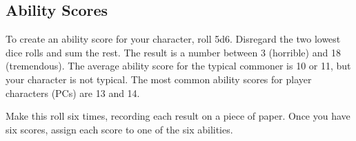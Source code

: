 \subsection{Ability Scores}

To create an ability score for your character, roll 5d6. Disregard the two lowest dice rolls and sum the rest. The result is a number between 3 (horrible) and 18 (tremendous). The average ability score for the typical commoner is 10 or 11, but your character is not typical. The most common ability scores for player characters (PCs) are 13 and 14.

Make this roll six times, recording each result on a piece of paper. Once you have six scores, assign each score to one of the six abilities.



